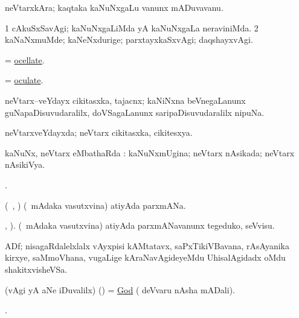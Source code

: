 \bentry
{}
\gl{\nA}
\bmng
neVtarxkAra; kaqtaka kaNuNxgaLu \mo vanunx mADuvavanu. 
\emng
\eentry

\bentry
{}
\gl{\kirxvi}
\bmng
\bnum
\num{1} cAkuSxSavAgi; kaNuNxgaLiMda yA kaNuNxgaLa neraviniMda. 
\num{2} kaNaNxmuMde; kaNeNxdurige; parxtayxkaSxvAgi; daqshayxvAgi. 
\enum
\emng
\eentry

\bentry
{}
\gl{\gu}
\bmng
= \hyperlink{ocellate}{ocellate}. 
\emng
\eentry

\bentry
{}
\gl{\gu}
\bmng
= \hyperlink{oculate}{oculate}. 
\emng
\eentry

\bentry
{}
\gl{\nA}
\bmng
neVtarx--veYdayx cikitasxka, tajacnx; kaNiNxna beVnegaLanunx guNapaDisuvudaralilx, doVSagaLanunx saripaDisuvudaralilx nipuNa. 
\emng
\eentry

\bentry
{}
\gl{\gu}
\bmng
neVtarxveYdayxda; neVtarx cikitasxka, cikitesxya. 
\emng
\eentry

\bentry
{}
\gl{\sapUpa}
\bmng
kaNuNx, neVtarx eMbathaRda \sapUpa:  kaNuNxmUgina; neVtarx nAsikada; neVtarx nAsikiVya. 
\emng
\eentry

\bentry
{}
\gl{\saMkiSx}
\bmng
{}. 
\emng
\eentry

\bentry
{}
\gl{\nA}
\bmng
(\kanmu\ \ame, \ashi) (\kanmu\ mAdaka vasutxvina) atiyAda parxmANa. 
\emng
\eentry

\bentry
{}
\gl{\akirx}
, \vakaq {}).\bmng
(\kanmu\ mAdaka vasutxvina) atiyAda parxmANavanunx tegeduko, seVvisu. 
\emng
\eentry

\bentry
{}
\gl{\nA}
\bmng
ADf; nisagaRdalelxlalx vAyxpisi kAMtatavx, saPxTikiVBavana, rAsAyanika kirxye, saMmoVhana, \mo vugaLige kAraNavAgideyeMdu UhisalAgidadx oMdu shakitxvisheVSa. 
\emng
\eentry

\bentry
{}
\gl{\nA}
\bmng
(\BAavayx vAgi yA aNe iDuvalilx) (\pArxparx) = \hyperref{kandict_g.pdf}{G}{god(1)}{God} ( deVvaru nAsha mADali). 
\emng
\eentry

\bentry
{}
\gl{\saMkiSx}
\bmng
{}. 
\emng
\eentry

